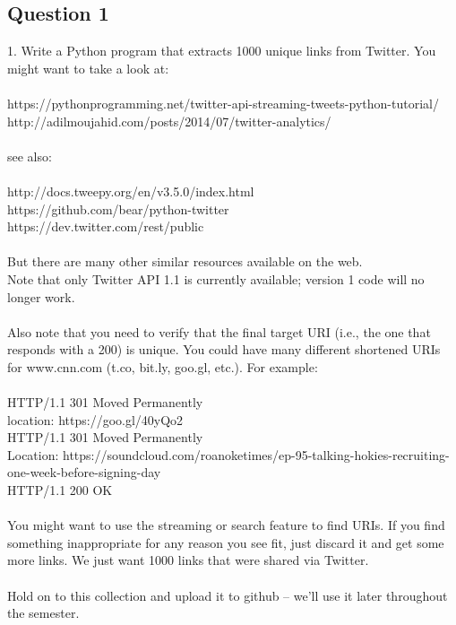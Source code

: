 \documentclass[10pt,letterpaper]{article}
\begin{document}
\subsection{Question 1}
1.  Write a Python program that extracts 1000 unique links from
Twitter.  You might want to take a look at:\\
\\
https://pythonprogramming.net/twitter-api-streaming-tweets-python-tutorial/\\
http://adilmoujahid.com/posts/2014/07/twitter-analytics/\\
\\
see also:\\
\\
http://docs.tweepy.org/en/v3.5.0/index.html\\
https://github.com/bear/python-twitter\\
https://dev.twitter.com/rest/public\\
\\
But there are many other similar resources available on the web.\\
Note that only Twitter API 1.1 is currently available; version 1
code will no longer work.\\
\\
Also note that you need to verify that the final target URI (i.e.,
the one that responds with a 200) is unique.  You could have many
different shortened URIs for www.cnn.com (t.co, bit.ly, goo.gl,
etc.).  For example:\\
\\
HTTP/1.1 301 Moved Permanently\\
location: https://goo.gl/40yQo2\\
HTTP/1.1 301 Moved Permanently\\
Location: https://soundcloud.com/roanoketimes/ep-95-talking-hokies-recruiting-one-week-before-signing-day\\
HTTP/1.1 200 OK\\
\\
You might want to use the streaming or search feature to find URIs. If
you find something inappropriate for any reason you see fit, just
discard it and get some more links.  We just want 1000 links that
were shared via Twitter.\\
\\
Hold on to this collection and upload it to github -- we'll use it
later throughout the semester.\\
\\
\end{document}
